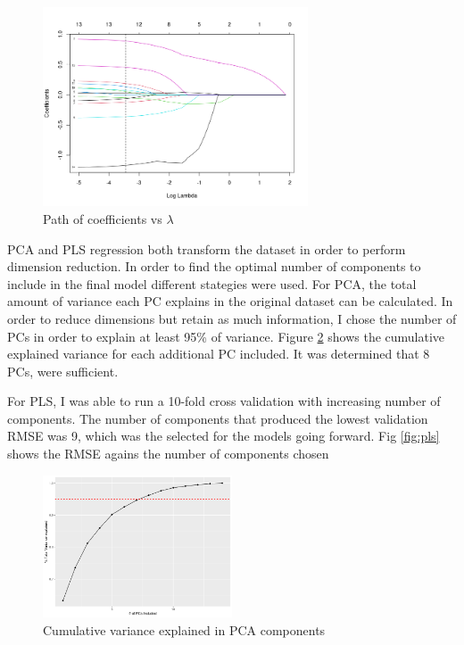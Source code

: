 \documentclass[12pt,letterpaper]{article}
\begin{document}
\begin{figure}[h!]
  \centering
  \includegraphics[width=0.7\textwidth]{lasso_path}
  \caption{Path of coefficients vs $\lambda$}
  \label{fig:lasso}
\end{figure}

PCA and PLS regression both transform the dataset in order to perform dimension reduction. In order to find the optimal number of components to include in the final model different stategies were used. For PCA, the total amount of variance each PC explains in the original dataset can be calculated. In order to reduce dimensions but retain as much information, I chose the number of PCs in order to explain at least 95\% of variance. Figure \ref{fig:pca} shows the cumulative explained variance for each additional PC included. It was determined that 8 PCs, were sufficient. 

For PLS, I was able to run a 10-fold cross validation with increasing number of components. The number of components that produced the lowest validation RMSE was 9, which was the selected for the models going forward. Fig \ref{fig:pls} shows the RMSE agains the number of components chosen

\begin{figure}[h!]
  \centering
  \includegraphics[width=0.5\textwidth]{pca_selection}
  \caption{Cumulative variance explained in PCA components}
  \label{fig:pca}
\end{figure}
\end{document}
